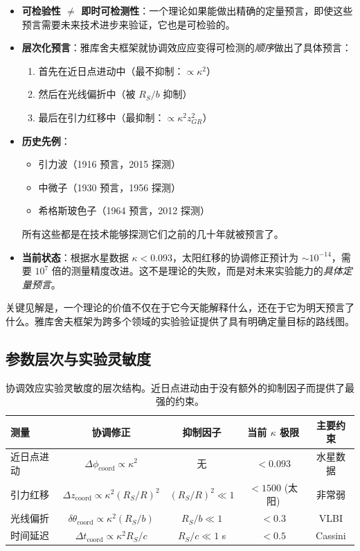 \documentclass[11pt,a4paper]{article}
\begin{document}
	\begin{itemize}
		\item \textbf{可检验性 $\neq$ 即时可检测性}：一个理论如果能做出精确的定量预言，即使这些预言需要未来技术进步来验证，它也是可检验的。
		
		\item \textbf{层次化预言}：雅库舍夫框架就协调效应应变得可检测的\textit{顺序}做出了具体预言：
		\begin{enumerate}
			\item 首先在近日点进动中（最不抑制：$\propto \kappa^2$）
			\item 然后在光线偏折中（被 $R_S/b$ 抑制）
			\item 最后在引力红移中（最抑制：$\propto \kappa^2 z_{GR}^2$）
		\end{enumerate}
		
		\item \textbf{历史先例}：
		\begin{itemize}
			\item 引力波（1916 预言，2015 探测）
			\item 中微子（1930 预言，1956 探测）
			\item 希格斯玻色子（1964 预言，2012 探测）
		\end{itemize}
		所有这些都是在技术能够探测它们之前的几十年就被预言了。
		
		\item \textbf{当前状态}：根据水星数据 $\kappa < 0.093$，太阳红移的协调修正预计为 $\sim 10^{-14}$，需要 $10^7$ 倍的测量精度改进。这不是理论的失败，而是对未来实验能力的\textit{具体定量预言}。
	\end{itemize}
	
	关键见解是，一个理论的价值不仅在于它今天能解释什么，还在于它为明天预言了什么。雅库舍夫框架为跨多个领域的实验验证提供了具有明确定量目标的路线图。
	
	\subsection{参数层次与实验灵敏度}
	
	\begin{table}[htbp]
		\centering
		\scriptsize
		\begin{tabular}{lcccc}
			\toprule
			\textbf{测量} & \textbf{协调修正} & \textbf{抑制因子} & \textbf{当前 $\kappa$ 极限} & \textbf{主要约束} \\
			\midrule
			近日点进动 & $\Delta\phi_{\text{coord}} \propto \kappa^2$ & 无 & $<0.093$ & 水星数据 \\
			引力红移 & $\Delta z_{\text{coord}} \propto \kappa^2(R_S/R)^2$ & $(R_S/R)^2 \ll 1$ & $<1500$ (太阳) & 非常弱 \\
			光线偏折 & $\delta\theta_{\text{coord}} \propto \kappa^2(R_S/b)$ & $R_S/b \ll 1$ & $<0.3$ & VLBI \\
			时间延迟 & $\Delta t_{\text{coord}} \propto \kappa^2 R_S/c$ & $R_S/c \ll 1$ s & $<0.5$ & Cassini \\
			\bottomrule
		\end{tabular}
		\caption{协调效应实验灵敏度的层次结构。近日点进动由于没有额外的抑制因子而提供了最强的约束。}
		\label{tab:sensitivity-hierarchy}
	\end{table}
	
\end{document}
